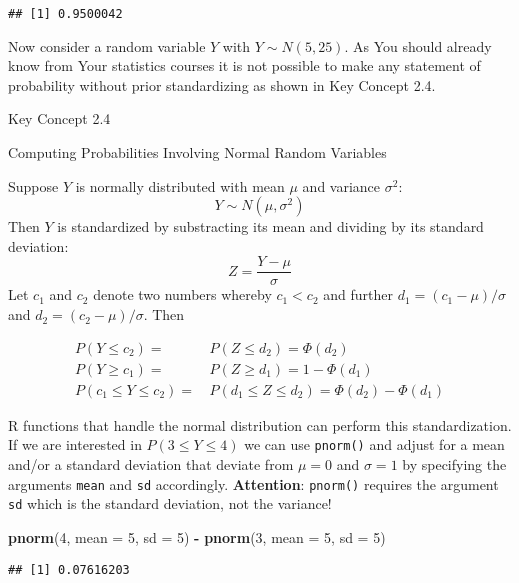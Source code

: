 \documentclass[]{book}
\newenvironment{Shaded}{\begin{snugshade}}{\end{snugshade}}
\newcommand{\KeywordTok}[1]{\textcolor[rgb]{0.13,0.29,0.53}{\textbf{#1}}}
\newcommand{\DataTypeTok}[1]{\textcolor[rgb]{0.13,0.29,0.53}{#1}}
\newcommand{\DecValTok}[1]{\textcolor[rgb]{0.00,0.00,0.81}{#1}}
\newcommand{\StringTok}[1]{\textcolor[rgb]{0.31,0.60,0.02}{#1}}
\newcommand{\OperatorTok}[1]{\textcolor[rgb]{0.81,0.36,0.00}{\textbf{#1}}}
\newcommand{\NormalTok}[1]{#1}
\theoremstyle{definition}
\theoremstyle{definition}
\theoremstyle{definition}
\theoremstyle{remark}
\begin{document}
\begin{verbatim}
## [1] 0.9500042
\end{verbatim}

Now consider a random variable \(Y\) with \(Y \sim N(5,25)\). As You
should already know from Your statistics courses it is not possible to
make any statement of probability without prior standardizing as shown
in Key Concept 2.4.

Key Concept 2.4

Computing Probabilities Involving Normal Random Variables

Suppose \(Y\) is normally distributed with mean \(\mu\) and variance
\(\sigma^2\): \[Y
\sim N(\mu, \sigma^2)\] Then \(Y\) is standardized by substracting its
mean and dividing by its standard deviation:
\[ Z = \frac{Y -\mu}{\sigma} \] Let \(c_1\) and \(c_2\) denote two
numbers whereby \(c_1 < c_2\) and further \(d_1 = (c_1 - \mu) / \sigma\)
and \(d_2 = (c_2 - \mu)/\sigma\). Then

\begin{align} 
P(Y \leq c_2) =& \, P(Z \leq d_2) = \Phi(d_2) \\ 
P(Y \geq c_1) =& \, P(Z \geq d_1) = 1 - \Phi(d_1) \\ 
P(c_1 \leq Y \leq c_2) =& \, P(d_1 \leq Z \leq d_2) = \Phi(d_2) - \Phi(d_1) 
\end{align}

R functions that handle the normal distribution can perform this
standardization. If we are interested in \(P(3 \leq Y \leq 4)\) we can
use \texttt{pnorm()} and adjust for a mean and/or a standard deviation
that deviate from \(\mu=0\) and \(\sigma = 1\) by specifying the
arguments \texttt{mean} and \texttt{sd} accordingly. \textbf{Attention}:
\texttt{pnorm()} requires the argument \texttt{sd} which is the standard
deviation, not the variance!

\begin{Shaded}
\begin{Highlighting}[]
\KeywordTok{pnorm}\NormalTok{(}\DecValTok{4}\NormalTok{, }\DataTypeTok{mean =} \DecValTok{5}\NormalTok{, }\DataTypeTok{sd =} \DecValTok{5}\NormalTok{) }\OperatorTok{-}\StringTok{ }\KeywordTok{pnorm}\NormalTok{(}\DecValTok{3}\NormalTok{, }\DataTypeTok{mean =} \DecValTok{5}\NormalTok{, }\DataTypeTok{sd =} \DecValTok{5}\NormalTok{) }
\end{Highlighting}
\end{Shaded}

\begin{verbatim}
## [1] 0.07616203
\end{verbatim}
\end{document}
